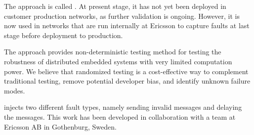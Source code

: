 The approach is called \approach{}. At present stage, it has not yet been deployed in customer production networks, as further validation is ongoing. However, it is now used in networks that are run internally at Ericsson to capture faults at last stage before deployment to production.

The \approach{}  approach provides non-deterministic testing method for testing the robustness of distributed embedded systems %
with very limited computation power. We believe that randomized testing is a cost-effective way to complement traditional testing, remove potential  developer bias, and identify unknown failure modes. 

\approach{} injects two different fault types, namely sending invalid messages and delaying the messages. 
This work has been developed in collaboration with a team at Ericsson AB in Gothenburg, Sweden. %

